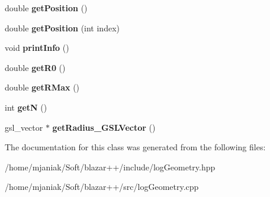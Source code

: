 \begin{DoxyCompactItemize}
\item 
\hypertarget{classlogGeometry_aaca3ce8b82281a8000d8d8cfb4762998}{double {\bfseries get\-Position} ()}\label{classlogGeometry_aaca3ce8b82281a8000d8d8cfb4762998}

\item 
\hypertarget{classlogGeometry_a8339ccfa0b3051709fd0386c06253ad9}{double {\bfseries get\-Position} (int index)}\label{classlogGeometry_a8339ccfa0b3051709fd0386c06253ad9}

\item 
\hypertarget{classlogGeometry_af4167416bf80d5e0c6cd520c1d4530e7}{void {\bfseries print\-Info} ()}\label{classlogGeometry_af4167416bf80d5e0c6cd520c1d4530e7}

\item 
\hypertarget{classlogGeometry_a80244c6af7c29c4980c67a8b1118e518}{double {\bfseries get\-R0} ()}\label{classlogGeometry_a80244c6af7c29c4980c67a8b1118e518}

\item 
\hypertarget{classlogGeometry_a44f4c2f05b49d5611af4469209388cc1}{double {\bfseries get\-R\-Max} ()}\label{classlogGeometry_a44f4c2f05b49d5611af4469209388cc1}

\item 
\hypertarget{classlogGeometry_ad147a417537a8725770955eba55d0ec0}{int {\bfseries get\-N} ()}\label{classlogGeometry_ad147a417537a8725770955eba55d0ec0}

\item 
\hypertarget{classlogGeometry_aa6f086bdef4ffe3094e46ea26a011672}{gsl\-\_\-vector $\ast$ {\bfseries get\-Radius\-\_\-\-G\-S\-L\-Vector} ()}\label{classlogGeometry_aa6f086bdef4ffe3094e46ea26a011672}

\end{DoxyCompactItemize}


The documentation for this class was generated from the following files\-:\begin{DoxyCompactItemize}
\item 
/home/mjaniak/\-Soft/blazar++/include/log\-Geometry.\-hpp\item 
/home/mjaniak/\-Soft/blazar++/src/log\-Geometry.\-cpp\end{DoxyCompactItemize}
